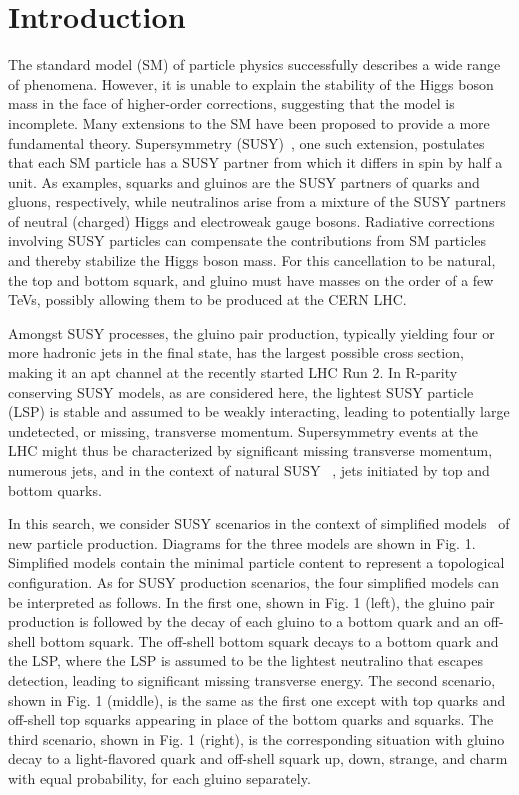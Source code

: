 

\newpage



\section{Introduction}

The standard model (SM) of particle physics successfully describes a wide range of phenomena.
However, it is unable to explain the stability of the Higgs boson mass in the face of higher-order corrections, suggesting
that the model is incomplete. Many extensions to the SM have been proposed to provide a more
fundamental theory.  Supersymmetry (SUSY)~\cite{SUSYtheo}, one such extension, postulates that each
SM particle has a SUSY partner from which it differs in spin by half a unit.  As
examples, squarks and gluinos are the SUSY partners of quarks and gluons, respectively, while
neutralinos arise from a mixture of the SUSY partners of neutral (charged)
Higgs and electroweak gauge bosons. Radiative corrections involving SUSY particles can compensate the contributions from SM particles and thereby stabilize the Higgs boson mass.  For this cancellation to be natural, the top and bottom squark, and gluino must have
masses on the order of a few TeVs, possibly allowing them to be produced at the CERN
LHC.

Amongst SUSY processes,  the gluino pair production,  typically yielding four or more hadronic
jets in the final state, has the largest possible cross section, making it an apt channel at
 the recently started LHC Run 2. In R-parity ~\cite{RParity} conserving
SUSY models, as are considered here, the lightest SUSY particle (LSP) is stable and assumed
to be weakly interacting, leading to potentially large undetected, or missing, transverse momentum. Supersymmetry events at the LHC might thus be characterized by significant missing
transverse momentum, numerous jets, and in the context of natural SUSY ~\cite{Naturaln}, jets initiated
by top and bottom quarks.

In this search, we consider SUSY scenarios in the context of simplified models~\cite{SMS1} of new particle
production. Diagrams for the three models are shown in Fig. 1. Simplified models contain
the minimal particle content to represent a topological configuration. As for SUSY production
scenarios, the four simplified models can be interpreted as follows. In the first one, shown
in Fig. 1 (left), the gluino pair production is followed by the decay of each gluino to a bottom
quark and an off-shell bottom squark. The off-shell bottom squark decays to a bottom quark
and the LSP, where the LSP is assumed to be the lightest neutralino 
that escapes detection, leading to significant missing transverse energy. The second scenario, shown in Fig. 1 (middle), is the same as the first one except with top quarks and off-shell top squarks appearing in place of the bottom
quarks and squarks. The third scenario, shown in Fig. 1 (right), is the corresponding
situation with gluino decay to a light-flavored quark and off-shell squark up, down, strange,
and charm with equal probability, for each gluino separately. 

